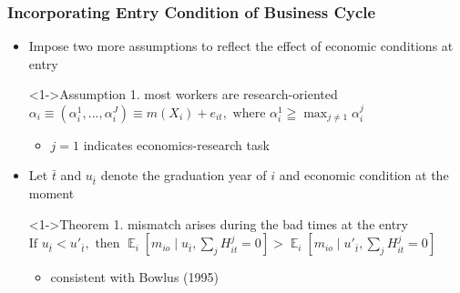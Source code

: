 \documentclass[11pt]{beamer}
\begin{document}
\begin{frame}
	\frametitle{Incorporating Entry Condition of Business Cycle}
	\begin{itemize}
		\item Impose two more assumptions to reflect the effect of economic conditions at entry
		\begin{block}<1->{Assumption 1. most workers are research-oriented}
			$\alpha_{i}\equiv \left( \alpha_{i}^1,...,\alpha_{i}^J\right) \equiv m(X_i)+e_{it}, \text{ where }  \alpha_{i}^1 \geqq \max_{j\ne 1} \alpha_{i}^j $  
		\end{block}
	\begin{itemize}
		\item $j=1$ indicates economics-research task 
	\end{itemize}
\vspace{1 mm}
        \item Let $\bar{t}$ and $u_{\bar{t}}$  denote the graduation year of $i$ and economic condition at the moment 
		\begin{block}<1->{Theorem 1. mismatch arises during the bad times at the entry}
		$\text{If } u_{\bar{t}}< u'_{\bar{t}},\text{ then }\mathop{{}\mathbb{E}}_{i}\left[ m_{io} \mid u_{\bar{t}}, \sum_{j} H_{it}^{j} = 0 \right] > \mathop{{}\mathbb{E}}_{i}\left[ m_{io} \mid u'_{\bar{t}}, \sum_{j} H_{it}^{j} = 0 \right]$
		\end{block}
		\begin{itemize}
			\item consistent with Bowlus (1995)
		\end{itemize}
	\end{itemize}
\end{frame}
\end{document}
